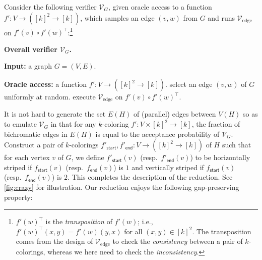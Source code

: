 \documentclass[11pt,fleqn]{article}
\renewcommand{\top}{\intercal}
\newcommand{\sss}{\mathsf{start}}
\newcommand{\ttt}{\mathsf{end}}
\newcommand{\V}{\calV}
\newcommand{\f}{f}
\newcommand{\Vedge}{\V_\mathrm{edge}}
\newcommand{\calV}{\mathcal{V}}
\theoremstyle{definition}
\numberwithin{equation}{section}
\begin{document}
Consider the following verifier $\V_G$,
given oracle access to a function $\f' \colon V \to ([k]^2 \to [k])$,
which
samples an edge $(v,w)$ from $G$ and
runs $\Vedge$ on $\f'(v) \circ \f'(w)^\top$:\footnote{
$\f'(w)^\top$ is the \emph{transposition} of $\f'(w)$; i.e.,
$\f'(w)^\top(x,y) = \f'(w)(y,x)$ for all $(x,y) \in [k]^2$.
The transposition comes from the design of $\Vedge$
to check the \emph{consistency} between a pair of $k$-colorings,
whereas we here need to check the \emph{inconsistency}.
}

\begin{itembox}[l]{\textbf{Overall verifier $\V_G$.}}
\begin{algorithmic}[1]
    \item[\textbf{Input:}]
        a graph $G = (V,E)$.
    \item[\textbf{Oracle access:}]
        a function $\f' \colon V \to ([k]^2 \to [k])$.
    \State select an edge $(v,w)$ of $G$ uniformly at random.
    \State execute $\Vedge$ on $\f'(v) \circ \f'(w)^\top$.
\end{algorithmic}
\end{itembox}

\noindent
It is not hard to generate the set $E(H)$ of (parallel) edges between $V(H)$ so as to
emulate $\V_G$ in that for any $k$-coloring $\f' \colon V \times [k]^2 \to [k]$,
the fraction of bichromatic edges in $E(H)$
is equal to 
the acceptance probability of $\V_G$.
Construct a pair of $k$-colorings $\f'_\sss, \f'_\ttt \colon V \to ([k]^2 \to [k])$ of $H$
such that for each vertex $v$ of $G$,
we define
$\f'_\sss(v)$ (resp.~$\f'_\ttt(v)$) 
to be
horizontally striped if $\f_\sss(v)$ (resp.~$\f_\ttt(v)$) is $1$ and
  vertically striped if $\f_\sss(v)$ (resp.~$\f_\ttt(v)$) is $2$.
This completes the description of the reduction.
See \cref{fig:crazy} for illustration.
Our reduction enjoys the following gap-preserving property:
\end{document}
